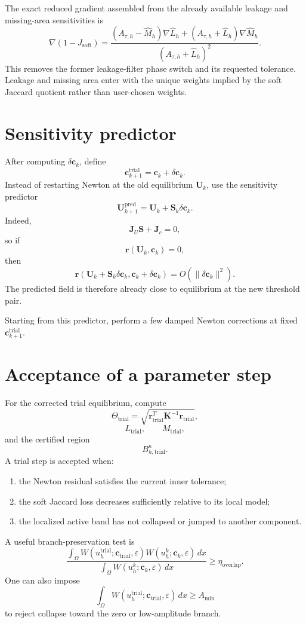 \documentclass[11pt]{article}
\newcommand{\bU}{\mathbf{U}}
\newcommand{\bc}{\mathbf{c}}
\newcommand{\br}{\mathbf{r}}
\newcommand{\bK}{\mathbf{K}}
\newcommand{\bJ}{\mathbf{J}}
\newcommand{\bS}{\mathbf{S}}
\begin{document}
The exact reduced gradient assembled from the already available leakage and
missing-area sensitivities is
\[
\nabla(1-J_{\mathrm{soft}})
=
\frac{
(A_{\tau,h}-\widehat M_h)\nabla\widehat L_h
+
(A_{\tau,h}+\widehat L_h)\nabla\widehat M_h
}{(A_{\tau,h}+\widehat L_h)^2}.
\]
This removes the former leakage-filter phase switch and its requested
tolerance.  Leakage and missing area enter with the unique weights implied by
the soft Jaccard quotient rather than user-chosen weights.

\section{Sensitivity predictor}

After computing $\delta\bc_k$, define
\[
\bc_{k+1}^{\mathrm{trial}}
=
\bc_k+\delta\bc_k.
\]
Instead of restarting Newton at the old equilibrium $\bU_k$, use the sensitivity predictor
\[
\boxed{
\bU_{k+1}^{\mathrm{pred}}
=
\bU_k+\bS_k\delta\bc_k.
}
\]
Indeed,
\[
\bJ_U\bS+\bJ_c=0,
\]
so if
\[
\br(\bU_k,\bc_k)=0,
\]
then
\[
\br\left(
\bU_k+\bS_k\delta\bc_k,
\bc_k+\delta\bc_k
\right)
=
O(\|\delta\bc_k\|^2).
\]
The predicted field is therefore already close to equilibrium at the new threshold pair.

Starting from this predictor, perform a few damped Newton corrections at fixed $\bc_{k+1}^{\mathrm{trial}}$.

\section{Acceptance of a parameter step}

For the corrected trial equilibrium, compute
\[
\Theta_{\mathrm{trial}}
=
\sqrt{
\br_{\mathrm{trial}}^T
\bK^{-1}
\br_{\mathrm{trial}}
},
\]
\[
L_{\mathrm{trial}},
\qquad
M_{\mathrm{trial}},
\]
and the certified region
\[
B_{h,\mathrm{trial}}^\kappa.
\]
A trial step is accepted when:
\begin{enumerate}[leftmargin=2em]
\item the Newton residual satisfies the current inner tolerance;
\item the soft Jaccard loss decreases sufficiently relative to its local model;
\item the localized active band has not collapsed or jumped to another component.
\end{enumerate}
A useful branch-preservation test is
\[
\frac{
\int_\Omega
W(u_h^{\mathrm{trial}};\bc_{\mathrm{trial}},\varepsilon)
W(u_h^k;\bc_k,\varepsilon)\,dx
}{
\int_\Omega
W(u_h^k;\bc_k,\varepsilon)\,dx
}
\geq
\eta_{\mathrm{overlap}}.
\]
One can also impose
\[
\int_\Omega
W(u_h^{\mathrm{trial}};\bc_{\mathrm{trial}},\varepsilon)\,dx
\geq
A_{\min}
\]
to reject collapse toward the zero or low-amplitude branch.
\end{document}
